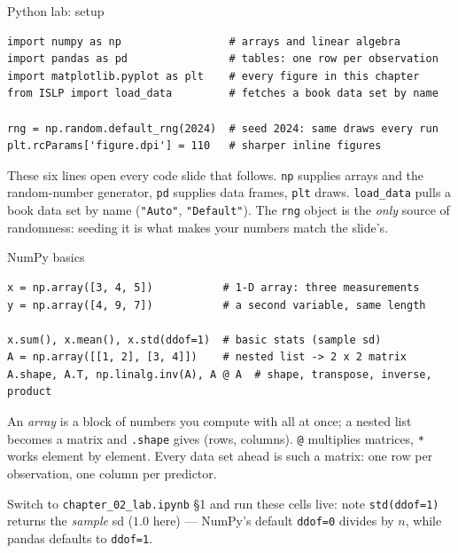 \documentclass[aspectratio=169,11pt]{beamer}
\begin{document}

\begin{frame}[fragile]{Python lab: setup}
  \begin{lstlisting}
import numpy as np                 # arrays and linear algebra
import pandas as pd                # tables: one row per observation
import matplotlib.pyplot as plt    # every figure in this chapter
from ISLP import load_data         # fetches a book data set by name

rng = np.random.default_rng(2024)  # seed 2024: same draws every run
plt.rcParams['figure.dpi'] = 110   # sharper inline figures
  \end{lstlisting}
  \begin{readme}
    These six lines open every code slide that follows. \texttt{np}
    supplies arrays and the random-number generator, \texttt{pd}
    supplies data frames, \texttt{plt} draws. \texttt{load\_data}
    pulls a book data set by name (\texttt{"Auto"}, \texttt{"Default"}).
    The \texttt{rng} object is the \emph{only} source of randomness:
    seeding it is what makes your numbers match the slide's.
  \end{readme}
\end{frame}

\begin{frame}[fragile]{NumPy basics}
  \begin{lstlisting}
x = np.array([3, 4, 5])           # 1-D array: three measurements
y = np.array([4, 9, 7])           # a second variable, same length

x.sum(), x.mean(), x.std(ddof=1)  # basic stats (sample sd)
A = np.array([[1, 2], [3, 4]])    # nested list -> 2 x 2 matrix
A.shape, A.T, np.linalg.inv(A), A @ A  # shape, transpose, inverse, product
  \end{lstlisting}
  \begin{readme}
    \footnotesize An \emph{array} is a block of numbers you compute
    with all at once; a nested list becomes a matrix and
    \texttt{.shape} gives (rows, columns). \texttt{@} multiplies
    matrices, \texttt{*} works element by element. Every data set
    ahead is such a matrix: one row per observation, one column per
    predictor.
  \end{readme}
  \begin{labnote}
    Switch to \texttt{chapter\_02\_lab.ipynb} \S1 and run these cells live: note
    \texttt{std(ddof=1)} returns the \emph{sample} sd ($1.0$ here) --- NumPy's default
    \texttt{ddof=0} divides by $n$, while pandas defaults to \texttt{ddof=1}.
  \end{labnote}
\end{frame}
\end{document}
